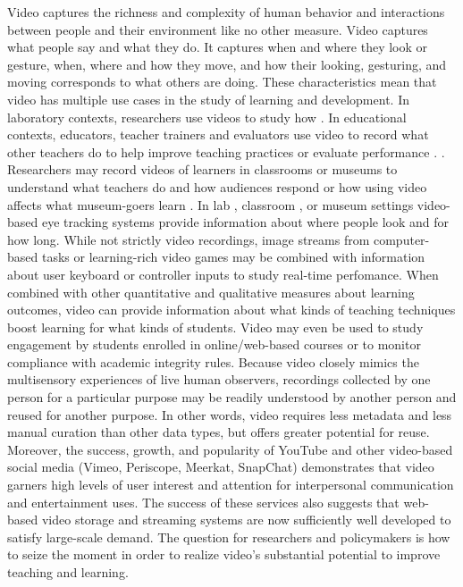 \documentclass[letterpaper,man,apacite]{apa6}
\begin{document}
Video captures the richness and complexity of human behavior and interactions between people and their environment like no other measure.
Video captures what people say and what they do.
It captures when and where they look or gesture, when, where and how they move, and how their looking, gesturing, and moving corresponds to what others are doing.
These characteristics mean that video has multiple use cases in the study of learning and development.
In laboratory contexts, researchers use videos to study how \cite{Karasik2014}.
In educational contexts, educators, teacher trainers and evaluators use video to record what other teachers do to help improve teaching practices or evaluate performance \cite{Blomberg2014, Masats20111151, Baecher2013189}.
.
Researchers may record videos of learners in classrooms \cite{Alibali2012} or museums to understand what teachers do and how audiences respond or how using video affects what museum-goers learn \cite{Bakken2015}.
In lab \cite{Kretch2014}, classroom \cite{Mason2015, Prieto:2014:STC:2669485.2669543}, or museum settings video-based eye tracking systems provide information about where people look and for how long.
While not strictly video recordings, image streams from computer-based tasks or learning-rich video games may be combined with information about user keyboard or controller inputs to study real-time perfomance.
When combined with other quantitative and qualitative measures about learning outcomes, video can provide information about what kinds of teaching techniques boost learning for what kinds of students.
Video may even be used to study engagement by students enrolled in online/web-based courses or to monitor compliance with academic integrity rules.
Because video closely mimics the multisensory experiences of live human observers, recordings collected by one person for a particular purpose may be readily understood by another person and reused for another purpose.
In other words, video requires less metadata and less manual curation than other data types, but offers greater potential for reuse.
Moreover, the success, growth, and popularity of YouTube and other video-based social media (Vimeo, Periscope, Meerkat, SnapChat) demonstrates that video garners high levels of user interest and attention for interpersonal communication and entertainment uses.
The success of these services also suggests that web-based video storage and streaming systems are now sufficiently well developed to satisfy large-scale demand.
The question for researchers and policymakers is how to seize the moment in order to realize video's substantial potential to improve teaching and learning. 
\end{document}
